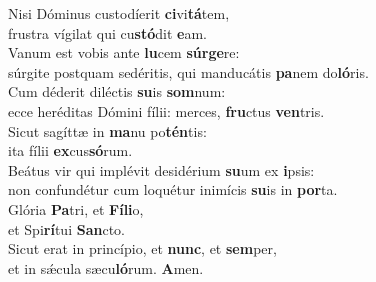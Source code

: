 \evenverse Nisi Dóminus custodíerit \textbf{ci}vi\textbf{tá}tem,~\*\\
\evenverse frustra vígilat qui cu\textbf{stó}dit \textbf{e}am.\\
\oddverse Vanum est vobis ante \textbf{lu}cem \textbf{súr}\textbf{ge}re:~\*\\
\oddverse súrgite postquam sedéritis, qui manducátis \textbf{pa}nem do\textbf{ló}ris.\\
\evenverse Cum déderit diléctis \textbf{su}is \textbf{som}num:~\*\\
\evenverse ecce heréditas Dómini fílii: merces, \textbf{fru}ctus \textbf{ven}tris.\\
\oddverse Sicut sagíttæ in \textbf{ma}nu po\textbf{tén}tis:~\*\\
\oddverse ita fílii \textbf{ex}cus\textbf{só}rum.\\
\evenverse Beátus vir qui implévit desidérium \textbf{su}um ex \textbf{i}psis:~\*\\
\evenverse non confundétur cum loquétur inimícis \textbf{su}is in \textbf{por}ta.\\
\oddverse Glória \textbf{Pa}tri, et \textbf{Fí}\textbf{li}o,~\*\\
\oddverse et Spi\textbf{rí}tui \textbf{San}cto.\\
\evenverse Sicut erat in princípio, et \textbf{nunc}, et \textbf{sem}per,~\*\\
\evenverse et in sǽcula sæcu\textbf{ló}rum. \textbf{A}men.\\
